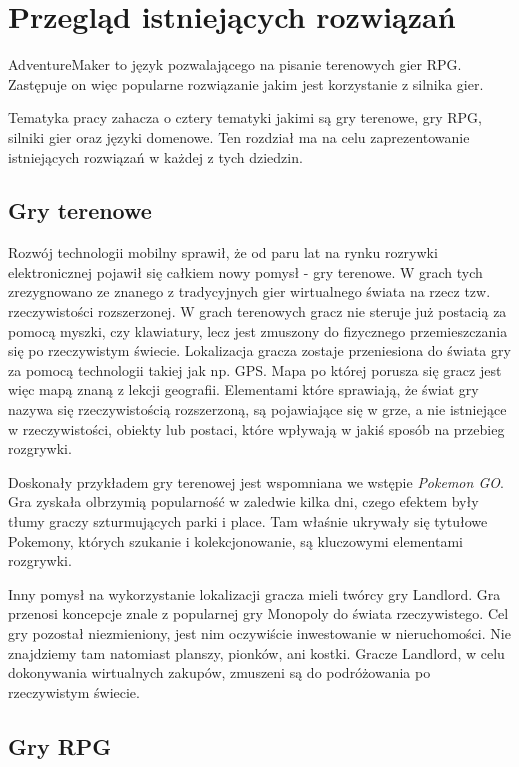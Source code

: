 \documentclass[openright]{xmgr}
\begin{document}
\chapter{Przegląd istniejących rozwiązań}

AdventureMaker to język pozwalającego na pisanie terenowych gier RPG. Zastępuje on więc popularne rozwiązanie jakim jest korzystanie z silnika gier.

Tematyka pracy zahacza o cztery tematyki jakimi są gry terenowe, gry RPG, silniki gier oraz języki domenowe. Ten rozdział ma na celu zaprezentowanie istniejących rozwiązań w każdej z tych dziedzin.

\section{Gry terenowe}

Rozwój technologii mobilny sprawił, że od paru lat na rynku rozrywki elektronicznej pojawił się całkiem nowy pomysł - gry terenowe. W grach tych zrezygnowano ze znanego z tradycyjnych gier wirtualnego świata na rzecz tzw. rzeczywistości rozszerzonej. W grach terenowych gracz nie steruje już postacią za pomocą myszki, czy klawiatury, lecz jest zmuszony do fizycznego przemieszczania się po rzeczywistym świecie. Lokalizacja gracza zostaje przeniesiona do świata gry za pomocą technologii takiej jak np. GPS. Mapa po której porusza się gracz jest więc mapą znaną z lekcji geografii. Elementami które sprawiają, że świat gry nazywa się rzeczywistością rozszerzoną, są pojawiające się w grze, a nie istniejące w rzeczywistości, obiekty lub postaci, które wpływają w jakiś sposób na przebieg rozgrywki.

Doskonały przykładem gry terenowej jest wspomniana we wstępie \textit{Pokemon GO}. Gra zyskała olbrzymią popularność w zaledwie kilka dni, czego efektem były tłumy graczy szturmujących parki i place. Tam właśnie ukrywały się tytułowe Pokemony, których szukanie i kolekcjonowanie, są kluczowymi elementami rozgrywki.

Inny pomysł na wykorzystanie lokalizacji gracza mieli twórcy gry Landlord. Gra przenosi koncepcje znale z popularnej gry Monopoly do świata rzeczywistego. Cel gry pozostał niezmieniony, jest nim oczywiście inwestowanie w nieruchomości. Nie znajdziemy tam natomiast planszy, pionków, ani kostki. Gracze Landlord, w celu dokonywania wirtualnych zakupów, zmuszeni są do podróżowania po rzeczywistym świecie.

\section{Gry RPG}
\end{document}
